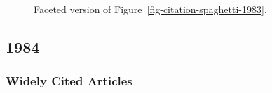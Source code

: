 \documentclass[
  10pt,
  letterpaper,
  DIV=11,
  numbers=noendperiod,
  twoside]{scrartcl}
\begin{document}
\begin{figure}


\caption{\label{fig-citation-facet-1983}Faceted version of
Figure~\ref{fig-citation-spaghetti-1983}.}

\end{figure}%

\newpage

\subsection{1984}\label{sec-s1984}

\subsubsection*{Widely Cited Articles}\label{widely-cited-articles-28}
\end{document}
